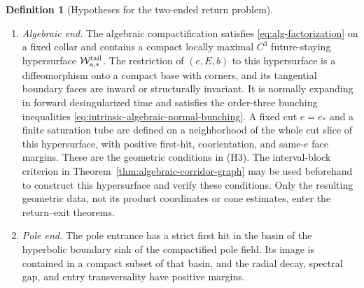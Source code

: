 \documentclass[11pt]{amsart}
\numberwithin{equation}{section}
\theoremstyle{definition}
\newtheorem{definition}[theorem]{Definition}
\theoremstyle{remark}
\begin{document}
\begin{definition}[Hypotheses for the two-ended return problem]
\begin{enumerate}
and all inactive face inequalities have positive margins on the
corresponding compact pre-event tubes; these tubes cover every assigned
relative interior in the preceding exhaustive list.  The three apertures have disjoint
closures inside the chosen outgoing window.  For each
$\mathsf t\in\{\mathrm a,\mathrm p\}$, fix a source sign
$\sigma_{\mathsf t}$, an interior anchor
$z^{\rm lim}_{\mathsf t}\in\operatorname{int}Z_{\rm exit}^0$ at a
positive distance from $\partial Z_{\rm exit}^0$, and a connected component
$\mathcal C^{\rm lim}_{\mathsf t,\sigma_{\mathsf t},\ell_{\mathsf t}}$
of the corresponding pullback sign stratum containing that anchor.  At the
anchor the active differentials retain the stated rank, and the
inactive-face and event-order inequalities have positive margins.  No
nonemptiness is required for every source sign or cell label.

\item \emph{Algebraic end.}
The algebraic compactification satisfies
\eqref{eq:alg-factorization} on a fixed collar and contains a compact
locally maximal $C^3$ future-staying hypersurface
$\mathcal W^{\rm tail}_{\mathrm a,*}$.  The restriction of $(e,E,b)$ to
this hypersurface is a diffeomorphism onto a compact base with corners,
and its tangential boundary faces are inward or structurally invariant.
It is normally expanding in forward desingularized time and satisfies the
order-three bunching inequalities
\eqref{eq:intrinsic-algebraic-normal-bunching}.  A fixed cut $e=e_*$ and a
finite saturation tube are defined on a neighborhood of the whole cut
slice of this hypersurface, with positive first-hit, coorientation, and
same-$e$ face margins.  These are the geometric conditions in
\textup{(H3)}.
The interval-block criterion in
Theorem~\ref{thm:algebraic-corridor-graph} may be used beforehand to
construct this hypersurface and verify these conditions.  Only the
resulting geometric data, not its product coordinates or cone estimates,
enter the return--exit theorems.

\item \emph{Pole end.}
The pole entrance has a strict first hit in the basin of the hyperbolic
boundary sink of the compactified pole field.  Its image is contained in
a compact subset of that basin, and the radial decay, spectral gap, and
entry transversality have positive margins.
\end{enumerate}
\end{definition}
\end{document}
